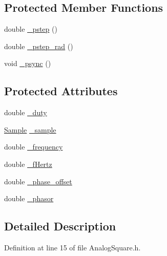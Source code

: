 \subsection*{Protected Member Functions}
\begin{DoxyCompactItemize}
\item 
double \hyperlink{classSignal_1_1SignalGenerator_a43b0eec84ee7df04c947533c0511c2c0}{\+\_\+pstep} ()
\item 
double \hyperlink{classSignal_1_1SignalGenerator_abf2f4ab977c6e84bf85022eab8135304}{\+\_\+pstep\+\_\+rad} ()
\item 
void \hyperlink{classSignal_1_1SignalGenerator_a563f57d4dfd8728a6a572f15c1e2532b}{\+\_\+psync} ()
\end{DoxyCompactItemize}
\subsection*{Protected Attributes}
\begin{DoxyCompactItemize}
\item 
double \hyperlink{classSignal_1_1Analog_1_1Square_a1f2fa9d4724764f65c4491ee8b80a6be}{\+\_\+duty}
\item 
\hyperlink{classSignal_1_1Sample}{Sample} \hyperlink{classSignal_1_1Analog_1_1AnalogGenerator_a8750d751c4dbc67084dfc74ab9a6a763}{\+\_\+sample}
\item 
double \hyperlink{classSignal_1_1SignalGenerator_a7f107461333bce68c5dad412db96a8c2}{\+\_\+frequency}
\item 
double \hyperlink{classSignal_1_1SignalGenerator_a85a4702347352bab1c71e0a8df8437d6}{\+\_\+f\+Hertz}
\item 
double \hyperlink{classSignal_1_1SignalGenerator_a6b4444d46747c8517171edbbf4b5588f}{\+\_\+phase\+\_\+offset}
\item 
double \hyperlink{classSignal_1_1SignalGenerator_af4aa0728ded00777be26a06d883eaeb3}{\+\_\+phasor}
\end{DoxyCompactItemize}


\subsection{Detailed Description}


Definition at line 15 of file Analog\+Square.\+h.



